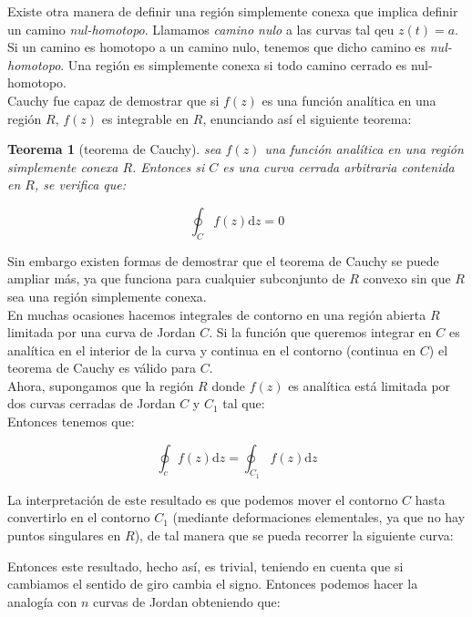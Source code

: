 \documentclass[12pt,a4paper]{book}
\newcommand{\D}{\mathrm{d}}
\newtheorem{theorem}{Teorema}[section]
\begin{document}
Existe otra manera de definir una región simplemente conexa que implica definir un camino \textit{nul-homotopo}. Llamamos \textit{camino nulo} a las curvas tal qeu $z(t) = a$. Si un camino es homotopo a un camino nulo, tenemos que dicho camino es \textit{nul-homotopo}. Una región es simplemente conexa si todo camino cerrado es nul-homotopo. \\

Cauchy fue capaz de demostrar que si  $f(z)$ es una función analítica en una región $R$, $f(z)$ es integrable en $R$, enunciando así el siguiente teorema:

\begin{theorem}[teorema de Cauchy]
sea $f(z)$ una función analítica en una región simplemente conexa $R$. Entonces si $C$ es una curva cerrada arbitraria contenida en $R$, se verifica que:

$$ \oint_C f(z) \D z = 0 $$
\end{theorem}

Sin embargo existen formas de demostrar que el teorema de Cauchy se puede ampliar más, ya que funciona para cualquier subconjunto de $R$ convexo sin que $R$ sea una región simplemente conexa. \\


En muchas ocasiones hacemos integrales de contorno en una región abierta $R$ limitada por una curva de Jordan $C$. Si la función que queremos integrar en $C$ es analítica en el interior de la curva y continua en el contorno (continua en $C$) el teorema de Cauchy es válido para $C$.  \\


Ahora, supongamos que la región $R$ donde $f(z)$ es analítica está limitada por dos curvas cerradas de Jordan $C$ y $C_1$ tal que:  \\ %

Entonces tenemos que:

\begin{equation}
\oint_c f(z) \D z = \oint_{C_1} f(z) \D z 
\end{equation}

La interpretación de este resultado es que podemos mover el contorno $C$ hasta convertirlo en el contorno $C_1$ (mediante deformaciones elementales, ya que no hay puntos singulares en $R$), de tal manera que se pueda recorrer la siguiente curva: %


Entonces este resultado, hecho así, es trivial, teniendo en cuenta que si cambiamos el sentido de giro cambia el signo. Entonces podemos hacer la analogía con $n$ curvas de Jordan obteniendo que:
\end{document}
